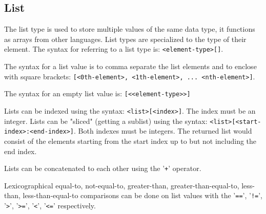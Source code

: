 
\subsection{List}
{
	The list type is used to store multiple values of the same data type,
	it functions as arrays from other languages.
	List types are specialized to the type of their element.
	The syntax for referring to a list type is: \texttt{<element-type>[]}.
	
	The syntax for a list value is to comma separate the list elements
	and to enclose with square
	brackets: \texttt{[<0th-element>, <1th-element>, ... <nth-element>]}.
	
	The syntax for an empty list value is: \texttt{[<<element-type>>]}
	
	Lists can be indexed using the
	syntax: \texttt{<list>[<index>]}. The
	index must be an integer.
	Lists can be "sliced" (getting a sublist) using
	the syntax: \texttt{<list>[<start-index>:<end-index>]}. Both
	indexes must be integers. The returned list would consist of
	the elements starting from the start index up to but not including
	the end index.
	
	Lists can be concatenated to each other using the '\texttt{+}' operator.
	
	Lexicographical equal-to, not-equal-to, greater-than, greater-than-equal-to,
	less-than, less-than-equal-to comparisons can be done on list values with
	the '\texttt{==}', '\texttt{!=}',
	'\texttt{>}', '\texttt{>=}', '\texttt{<}', '\texttt{<=}' respectively.
}




















